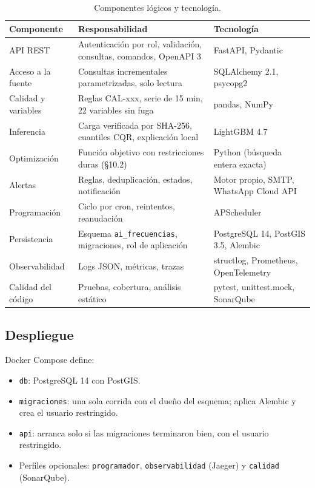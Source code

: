 \documentclass[10pt,a4paper]{article}
\newcommand{\cod}[1]{\texttt{\small #1}}
\begin{document}
\begin{table}[H]
\centering\small
\caption{Componentes lógicos y tecnología.}\label{tab:componentes}
\begin{tabularx}{\textwidth}{lYl}
\toprule
\textbf{Componente} & \textbf{Responsabilidad} & \textbf{Tecnología} \\
\midrule
API REST & Autenticación por rol, validación, consultas, comandos, OpenAPI 3 & FastAPI, Pydantic \\
Acceso a la fuente & Consultas incrementales parametrizadas, solo lectura & SQLAlchemy 2.1, psycopg2 \\
Calidad y variables & Reglas CAL-xxx, serie de 15 min, 22 variables sin fuga & pandas, NumPy \\
Inferencia & Carga verificada por SHA-256, cuantiles CQR, explicación local & LightGBM 4.7 \\
Optimización & Función objetivo con restricciones duras (§10.2) & Python (búsqueda entera exacta) \\
Alertas & Reglas, deduplicación, estados, notificación & Motor propio, SMTP, WhatsApp Cloud API \\
Programación & Ciclo por cron, reintentos, reanudación & APScheduler \\
Persistencia & Esquema \cod{ai\_frecuencias}, migraciones, rol de aplicación & PostgreSQL 14, PostGIS 3.5, Alembic \\
Observabilidad & Logs JSON, métricas, trazas & structlog, Prometheus, OpenTelemetry \\
Calidad del código & Pruebas, cobertura, análisis estático & pytest, unittest.mock, SonarQube \\
\bottomrule
\end{tabularx}
\end{table}

\subsection{Despliegue}

Docker Compose define:

\begin{itemize}
  \item \cod{db}: PostgreSQL 14 con PostGIS.
  \item \cod{migraciones}: una sola corrida con el dueño del esquema; aplica Alembic y crea el usuario restringido.
  \item \cod{api}: arranca solo si las migraciones terminaron bien, con el usuario restringido.
  \item Perfiles opcionales: \cod{programador}, \cod{observabilidad} (Jaeger) y \cod{calidad} (SonarQube).
\end{itemize}
\end{document}
